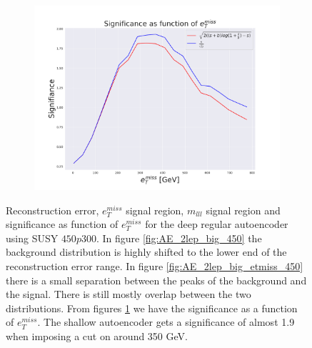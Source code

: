 \begin{figure}[H]
    \begin{subfigure}{.50\textwidth}
        \includegraphics[width=\textwidth]{Figures/AE_testing/big/2lep/significance_etmiss_450p0p0300_-1.4360553938127363.pdf}
        \caption{}
        \label{fig:AE_2lep_big_signi_450}
    \end{subfigure}
    \hfill      
    \caption[2lep deep network | $450p300$ | AE]{Reconstruction error, $e_T^{miss}$ signal region, $m_{lll}$ signal region and significance as function of 
    $e_T^{miss}$ for the deep regular autoencoder using SUSY $450p300$. In figure \ref{fig:AE_2lep_big_450} the background distribution is highly shifted to the lower end of the 
    reconstruction error range. In figure \ref{fig:AE_2lep_big_etmiss_450} there is a small separation between the peaks of the background
    and the signal. There is still mostly overlap between the two distributions. 
    From figures  \ref{fig:AE_2lep_big_signi_450} we have the significance as a function of $e_T^{miss}$. 
    The shallow autoencoder gets a significance of almost 1.9 when imposing a cut on around 350 GeV.}
    \label{fig:AE_2lep_big_rec_sig_signi_450}
\end{figure}


